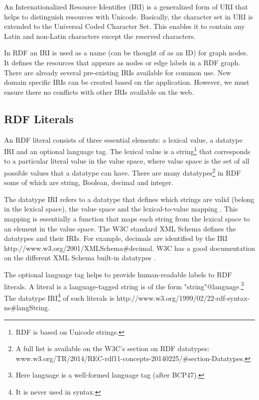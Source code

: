 An Internationalized Resource Identifier (\acrshort{IRI}) is a generalized form of URI that helps to distinguish resources with Unicode. Basically, the character set in URI is extended to the Universal Coded Character Set. This enables it to contain any Latin and non-Latin characters except the reserved characters.

In RDF an IRI is used as a name (can be thought of as an ID) for graph nodes. It defines the resources that appears as nodes or edge labels in a RDF graph. There are already several pre-existing IRIs available for common use. New domain specific IRIs can be created based on the application. However, we must ensure there no conflicts with other IRIs available on the web.

\subsection*{RDF Literals}

An RDF literal consists of three essential elements: a lexical value, a datatype IRI and an optional language tag. The lexical value is a string\footnote{RDF is based on Unicode strings.} that corresponds to a particular literal value in the value space, where value space is the set of all possible values that a datatype can have. There are many datatypes\footnote{A full list is available on the W3C's section on RDF datatypes: www.w3.org/TR/2014/REC-rdf11-concepts-20140225/\#section-Datatypes.} in RDF some of which are string, Boolean, decimal and integer.

The datatype IRI refers to a datatype that defines which strings are valid (belong in the lexical space), the value space and the lexical-to-value mapping \cite{ Bonduel2019}. This mapping is essentially a function that maps each string from the lexical space to an element in the value space. The \acrshort{W3C} standard XML Schema defines the datatypes and their IRIs. For example, decimals are identified by the IRI http://www.w3.org/2001/XMLSchema\#decimal. W3C has a good documentation on the different XML Schema built-in datatypes \cite{ R.Cyganiak2014}.

The optional language tag helps to provide human-readable labels to RDF literals. A literal is a language-tagged string is of the form "string"@language.\footnote{Here language is a well-formed language tag (after \acrshort{BCP47}).} The datatype IRI\footnote{It is never used in syntax.} of such literals is http://www.w3.org/1999/02/22-rdf-syntax-ns\#langString.

